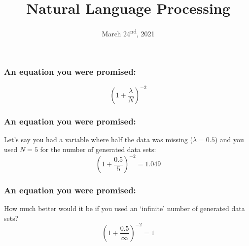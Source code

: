 \documentclass{beamer}
\title{Natural Language Processing}%
\subtitle{\blueit{Data Science, Spring 2021}}
\date{March 24\textsuperscript{nd}, 2021}
\begin{document}
	\frame {
		\titlepage
	}






  \begin{frame}
    \frametitle{An equation you were promised:}
    \begin{equation*}
      (1 + \frac{\lambda}{N})^{-2}
    \end{equation*}
  \end{frame}

  \begin{frame}
    \frametitle{An equation you were promised:}
    Let's say you had a variable where half the data was missing
    ($\lambda = 0.5$) and you used $N = 5$ for the number of generated data
    sets:
    \begin{equation*}
      (1 + \frac{0.5}{5})^{-2} = 1.049
    \end{equation*}
  \end{frame}

  \begin{frame}
    \frametitle{An equation you were promised:}
    How much better would it be if you used an `infinite' number of generated
    data sets?
    \begin{equation*}
      (1 + \frac{0.5}{\infty})^{-2} = 1
    \end{equation*}
  \end{frame}
\end{document}
